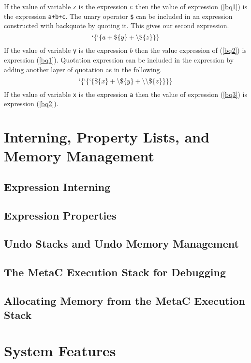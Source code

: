 \documentclass{article}
\begin{document}
If the value of variable {\tt z} is the expression {\tt c} then the value of expression (\ref{bq1}) is the expression {\tt a+b+c}.
The unary operator {\tt \$} can be included in an expression constructed with backquote by quoting it.  This gives our second expression.
\begin{equation}
\label{bq2}
`\{`\{a + \$\{y\} + \backslash\$\{z\}\}\}
\end{equation}
If the value of variable {\tt y} is the expression $b$ then the value expression of (\ref{bq2}) is expression (\ref{bq1}).
Quotation expression can be included in the expression by adding another layer of quotation as in the following.
\begin{equation}
\label{bq3}
`\{`\{`\{\$\{x\} + \backslash\$\{y\} + \backslash\backslash\$\{z\}\}\}\}
\end{equation}
If the value of variable {\tt x} is the expression {\tt a} then the value of expression (\ref{bq3}) is expression (\ref{bq2}).

\section{Interning, Property Lists, and Memory Management}

\subsection{Expression Interning}

\subsection{Expression Properties}

\subsection{Undo Stacks and Undo Memory Management}

\subsection{The MetaC Execution Stack for Debugging}

\subsection{Allocating Memory from the MetaC Execution Stack}

\section{System Features}
\end{document}
